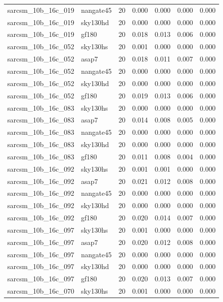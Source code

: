 \begin{tabular}{llrrrrr}
sarcsm\_10b\_16c\_019 & nangate45 & 20 & 0.000 & 0.000 & 0.000 & 0.000 \\
sarcsm\_10b\_16c\_019 & sky130hd & 20 & 0.000 & 0.000 & 0.000 & 0.000 \\
sarcsm\_10b\_16c\_019 & gf180 & 20 & 0.018 & 0.013 & 0.006 & 0.000 \\
sarcsm\_10b\_16c\_052 & sky130hs & 20 & 0.001 & 0.000 & 0.000 & 0.000 \\
sarcsm\_10b\_16c\_052 & asap7 & 20 & 0.018 & 0.011 & 0.007 & 0.000 \\
sarcsm\_10b\_16c\_052 & nangate45 & 20 & 0.000 & 0.000 & 0.000 & 0.000 \\
sarcsm\_10b\_16c\_052 & sky130hd & 20 & 0.000 & 0.000 & 0.000 & 0.000 \\
sarcsm\_10b\_16c\_052 & gf180 & 20 & 0.019 & 0.013 & 0.006 & 0.000 \\
sarcsm\_10b\_16c\_083 & sky130hs & 20 & 0.000 & 0.000 & 0.000 & 0.000 \\
sarcsm\_10b\_16c\_083 & asap7 & 20 & 0.014 & 0.008 & 0.005 & 0.000 \\
sarcsm\_10b\_16c\_083 & nangate45 & 20 & 0.000 & 0.000 & 0.000 & 0.000 \\
sarcsm\_10b\_16c\_083 & sky130hd & 20 & 0.000 & 0.000 & 0.000 & 0.000 \\
sarcsm\_10b\_16c\_083 & gf180 & 20 & 0.011 & 0.008 & 0.004 & 0.000 \\
sarcsm\_10b\_16c\_092 & sky130hs & 20 & 0.001 & 0.001 & 0.000 & 0.000 \\
sarcsm\_10b\_16c\_092 & asap7 & 20 & 0.021 & 0.012 & 0.008 & 0.000 \\
sarcsm\_10b\_16c\_092 & nangate45 & 20 & 0.000 & 0.000 & 0.000 & 0.000 \\
sarcsm\_10b\_16c\_092 & sky130hd & 20 & 0.000 & 0.000 & 0.000 & 0.000 \\
sarcsm\_10b\_16c\_092 & gf180 & 20 & 0.020 & 0.014 & 0.007 & 0.000 \\
sarcsm\_10b\_16c\_097 & sky130hs & 20 & 0.001 & 0.000 & 0.000 & 0.000 \\
sarcsm\_10b\_16c\_097 & asap7 & 20 & 0.020 & 0.012 & 0.008 & 0.000 \\
sarcsm\_10b\_16c\_097 & nangate45 & 20 & 0.000 & 0.000 & 0.000 & 0.000 \\
sarcsm\_10b\_16c\_097 & sky130hd & 20 & 0.000 & 0.000 & 0.000 & 0.000 \\
sarcsm\_10b\_16c\_097 & gf180 & 20 & 0.020 & 0.013 & 0.007 & 0.000 \\
sarcsm\_10b\_16c\_070 & sky130hs & 20 & 0.001 & 0.000 & 0.000 & 0.000 \\

\end{tabular}
